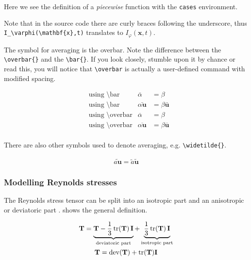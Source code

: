 Here we see the definition of a \emph{piecewise} function with the \verb+cases+ environment.


Note that in the source code there are curly braces following the underscore, thus 
\verb+I_\varphi(\mathbf{x},t)+ translates to $I_\varphi(\mathbf{x},t)$.


The symbol for averaging is the overbar. Note the difference between the \verb+\overbar{}+ 
and the \verb+\bar{}+. If you look closely, stumble upon it by chance or read this, you will 
notice that \verb+\overbar+ is actually a user-defined command with modified spacing.

\begin{align}
	&\text{using \textbackslash{}bar} & \bar{\alpha} &= \beta \\ %
	&\text{using \textbackslash{}bar} & \bar{\alpha \mathbf{u}} &= \beta \bar{\mathbf{u}} \\ %
	&\text{using \textbackslash{}overbar} & \overbar{\alpha} &= \beta \\ %
	&\text{using \textbackslash{}overbar} & \overbar{\alpha \mathbf{u}} &= \beta \overbar{\mathbf{u}} \\ %
\end{align}

There are also other symbols used to denote averaging, e.g. \verb+\widetilde{}+.

\begin{gather}
	\widetilde{a \mathbf{u}} = \widetilde{a} \widetilde{\mathbf{u}}
\end{gather}





\subsubsection{Modelling Reynolds stresses}

The Reynolds stress tensor can be split into an isotropic part and an anisotropic or 
deviatoric part \cite{pope2000}.  shows the general definition.

\begin{gather}
	\mathbf{T} = \underbrace{\mathbf{T} - \frac{1}{3} \operatorname{tr}(\mathbf{T}) \,\mathbf{I}}_{\text{deviatoric part}}
		+ \underbrace{\frac{1}{3} \operatorname{tr}(\mathbf{T}) \,\mathbf{I}}_{\text{isotropic part}} 
		\label{eq:tensorDeviatorDecomposition}\\
	\mathbf{T} = \operatorname{dev}(\mathbf{T}) + \operatorname{tr}(\mathbf{T}) \mathbf{I}
\end{gather}


